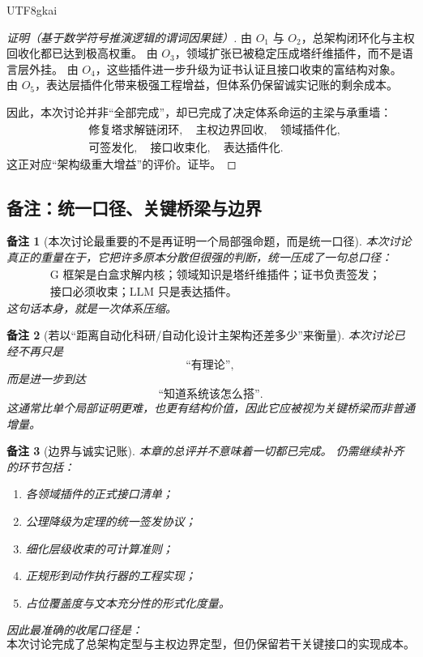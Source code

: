 \documentclass[12pt]{article}
\newtheorem{remark}{备注}[section]
\begin{document}
\begin{CJK*}{UTF8}{gkai}
\begin{proof}[证明（基于数学符号推演逻辑的谓词因果链）]
由 $O_1$ 与 $O_2$，总架构闭环化与主权回收化都已达到极高权重。
由 $O_3$，领域扩张已被稳定压成塔纤维插件，而不是语言层外挂。
由 $O_4$，这些插件进一步升级为证书认证且接口收束的富结构对象。
由 $O_5$，表达层插件化带来极强工程增益，但体系仍保留诚实记账的剩余成本。

因此，本次讨论并非“全部完成”，却已完成了决定体系命运的主梁与承重墙：
\[
  \begin{aligned}
    &\text{修复塔求解链闭环},
    \quad
    \text{主权边界回收},
    \quad
    \text{领域插件化},\\
    &\text{可签发化},
    \quad
    \text{接口收束化},
    \quad
    \text{表达插件化}.
  \end{aligned}
\]
这正对应“架构级重大增益”的评价。证毕。
\end{proof}

\subsection{备注：统一口径、关键桥梁与边界}
\label{subsec:tex37-ch10-remarks}

\begin{remark}[本次讨论最重要的不是再证明一个局部强命题，而是统一口径]
本次讨论真正的重量在于，它把许多原本分散但很强的判断，统一压成了一句总口径：
\[
  \boxed{
    \begin{aligned}
      &\text{G 框架是白盒求解内核；领域知识是塔纤维插件；证书负责签发；}\\
      &\text{接口必须收束；LLM 只是表达插件。}
    \end{aligned}
  }
\]
这句话本身，就是一次体系压缩。
\end{remark}

\begin{remark}[若以“距离自动化科研/自动化设计主架构还差多少”来衡量]
本次讨论已经不再只是
\[
  \text{“有理论”},
\]
而是进一步到达
\[
  \text{“知道系统该怎么搭”}.
\]
这通常比单个局部证明更难，也更有结构价值，因此它应被视为关键桥梁而非普通增量。
\end{remark}

\begin{remark}[边界与诚实记账]
本章的总评并不意味着一切都已完成。
仍需继续补齐的环节包括：
\begin{enumerate}
  \item 各领域插件的正式接口清单；
  \item 公理降级为定理的统一签发协议；
  \item 细化层级收束的可计算准则；
  \item 正规形到动作执行器的工程实现；
  \item 占位覆盖度与文本充分性的形式化度量。
\end{enumerate}
因此最准确的收尾口径是：
\[
  \boxed{
    \text{本次讨论完成了总架构定型与主权边界定型，但仍保留若干关键接口的实现成本。}
  }
\]
\end{remark}


\end{CJK*}
\end{document}
